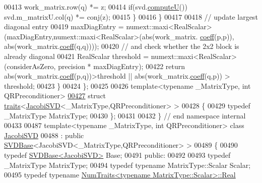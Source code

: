 \begin{DoxyCode}
00413         work\_matrix.row(q) *= z;
00414         \textcolor{keywordflow}{if}(svd.\hyperlink{group___s_v_d___module_a705a7c2709e1624ccc19aa748a78d473}{computeU}()) svd.m\_matrixU.col(q) *= conj(z);
00415       \}
00416     \}
00417 
00418     \textcolor{comment}{// update largest diagonal entry}
00419     maxDiagEntry = numext::maxi<RealScalar>(maxDiagEntry,numext::maxi<RealScalar>(abs(work\_matrix.
      \hyperlink{class_eigen_1_1_plain_object_base_afbfc12954f16d21aedb7bd839f64a278}{coeff}(p,p)), abs(work\_matrix.\hyperlink{class_eigen_1_1_plain_object_base_afbfc12954f16d21aedb7bd839f64a278}{coeff}(q,q))));
00420     \textcolor{comment}{// and check whether the 2x2 block is already diagonal}
00421     RealScalar threshold = numext::maxi<RealScalar>(considerAsZero, precision * maxDiagEntry);
00422     \textcolor{keywordflow}{return} abs(work\_matrix.\hyperlink{class_eigen_1_1_plain_object_base_afbfc12954f16d21aedb7bd839f64a278}{coeff}(p,q))>threshold || abs(work\_matrix.\hyperlink{class_eigen_1_1_plain_object_base_afbfc12954f16d21aedb7bd839f64a278}{coeff}(q,p)) > threshold;
00423   \}
00424 \};
00425 
00426 \textcolor{keyword}{template}<\textcolor{keyword}{typename} \_MatrixType, \textcolor{keywordtype}{int} QRPreconditioner> 
\hyperlink{struct_eigen_1_1internal_1_1traits_3_01_jacobi_s_v_d_3_01___matrix_type_00_01_q_r_preconditioner_01_4_01_4}{00427} \textcolor{keyword}{struct }\hyperlink{struct_eigen_1_1internal_1_1traits}{traits}<\hyperlink{group___s_v_d___module_class_eigen_1_1_jacobi_s_v_d}{JacobiSVD}<\_MatrixType,QRPreconditioner> >
00428 \{
00429   \textcolor{keyword}{typedef} \_MatrixType MatrixType;
00430 \};
00431 
00432 \} \textcolor{comment}{// end namespace internal}
00433 
00487 \textcolor{keyword}{template}<\textcolor{keyword}{typename} \_MatrixType, \textcolor{keywordtype}{int} QRPreconditioner> \textcolor{keyword}{class }\hyperlink{group___s_v_d___module_class_eigen_1_1_jacobi_s_v_d}{JacobiSVD}
00488  : \textcolor{keyword}{public} \hyperlink{group___s_v_d___module_class_eigen_1_1_s_v_d_base}{SVDBase}<JacobiSVD<\_MatrixType,QRPreconditioner> >
00489 \{
00490     \textcolor{keyword}{typedef} \hyperlink{group___s_v_d___module_class_eigen_1_1_s_v_d_base}{SVDBase<JacobiSVD>} Base;
00491   \textcolor{keyword}{public}:
00492 
00493     \textcolor{keyword}{typedef} \_MatrixType MatrixType;
00494     \textcolor{keyword}{typedef} \textcolor{keyword}{typename} MatrixType::Scalar Scalar;
00495     \textcolor{keyword}{typedef} \textcolor{keyword}{typename} \hyperlink{group___core___module_struct_eigen_1_1_num_traits}{NumTraits<typename MatrixType::Scalar>::Real}

\end{DoxyCode}
